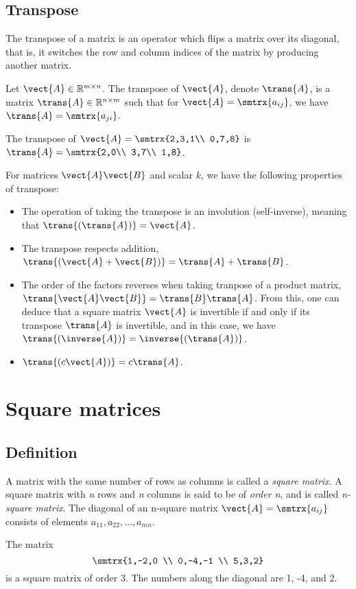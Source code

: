 \subsection{Transpose}
The transpose of a matrix is an operator which flips a matrix over its diagonal, that is, it switches the row and column indices of the matrix by producing another matrix.\par 
Let $\vect{A}\in \mathbb{R}^{m\times n}$. The transpose of $\vect{A}$, denote $\trans{A}$, is a matrix $\trans{A}\in \mathbb{R}^{n\times m}$ such that for $\vect{A}=\smtrx{a_{ij}}$, we have $\trans{A}=\smtrx{a_{ji}}$.\par 
\begin{example}
    The transpose of $\vect{A}=\smtrx{2,3,1\\ 0,7,8}$ is $\trans{A}=\smtrx{2,0\\ 3,7\\ 1,8}$.
\end{example}
For matrices $\vect{A}\vect{B}$ and scalar $k$, we have the following properties of transpose:
\begin{itemize}
\item The operation of taking the transpose is an involution (self-inverse), meaning that $\trans{\left( \trans{A} \right)}=\vect{A}$.
\item The transpose respects addition, $\trans{\left( \vect{A}+\vect{B} \right)}=\trans{A}+\trans{B}$.
\item The order of the factors reverses when taking tranpose of a product matrix, $\trans{\vect{A}\vect{B}}=\trans{B}\trans{A}$. From this, one can deduce that a square matrix $\vect{A}$ is invertible if and only if its transpose $\trans{A}$ is invertible, and in this case, we have $\trans{\left( \inverse{A} \right)}=\inverse{\left( \trans{A} \right)}$.
\item $\trans{\left( c\vect{A} \right)}=c\trans{A}$.
\end{itemize}

\section{Square matrices}
\subsection{Definition}
A matrix with the same number of rows as columns is called a \emph{square matrix}. A square matrix with \emph{n} rows and \emph{n} columns is said to be of \emph{order n}, and is called \emph{n-square matrix}. The diagonal of an n-square matrix $\vect{A}=\smtrx{a_{ij}}$ consists of elements $a_{11},a_{22},\ldots , a_{mn}$.
\begin{example}
The matrix \[ \smtrx{1,-2,0 \\ 0,-4,-1 \\ 5,3,2} \] is a square matrix of order 3. The numbers along the diagonal are 1, -4, and 2.
\end{example}

